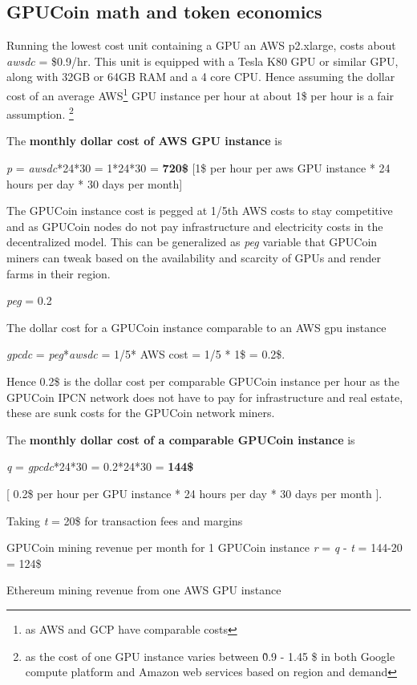 \subsection{GPUCoin math and token economics}
Running the lowest cost unit containing a GPU an AWS p2.xlarge, costs about \emph{awsdc} = \$0.9/hr. This unit is equipped with a Tesla K80 GPU or similar GPU, along with 32GB or 64GB RAM and a 4 core CPU. 
Hence assuming the dollar cost of an average AWS\footnote{as AWS and GCP have comparable costs} GPU instance per hour at about 1\$ per hour is a fair assumption. \footnote{ as the cost of one GPU instance varies between \~ 0.9 - 1.45 \$ in both Google compute platform and Amazon web services based on region and demand}

The \textbf{monthly dollar cost of AWS GPU instance} is

\emph{p} = \emph{awsdc}*24*30 = 1*24*30 = \textbf{720\$  } [1\$ per hour per aws GPU instance * 24 hours per day * 30 days per month]


The GPUCoin instance cost is pegged at 1/5th AWS costs to stay competitive and as GPUCoin nodes do not pay infrastructure and electricity costs in the decentralized model. This can be generalized as \emph{peg} variable that GPUCoin miners can tweak based on the availability and scarcity of GPUs and render farms in their region.

\emph{peg} = 0.2

The dollar cost for a GPUCoin instance comparable to an AWS gpu instance 

\emph{gpcdc} = \emph{peg}*\emph{awsdc} =  1/5* AWS cost = 1/5 * 1\$ = 0.2\$.

Hence 0.2\$ is the dollar cost per comparable GPUCoin instance per hour as the GPUCoin IPCN network does not have to pay for infrastructure and real estate, these are sunk costs for the GPUCoin network miners.

The \textbf{monthly dollar cost of a comparable GPUCoin instance} is 

\emph{q} = \emph{gpcdc}*24*30 = 0.2*24*30 = \textbf{144\$ }

[ 0.2\$ per hour per GPU instance * 24 hours per day * 30 days per month ].


Taking \emph{t} = 20\$ for transaction fees and margins

GPUCoin mining revenue per month for 1 GPUCoin instance
\emph{r} = \emph{q} - \emph{t} = 144-20 = 124\$

Ethereum mining revenue from one AWS GPU instance

